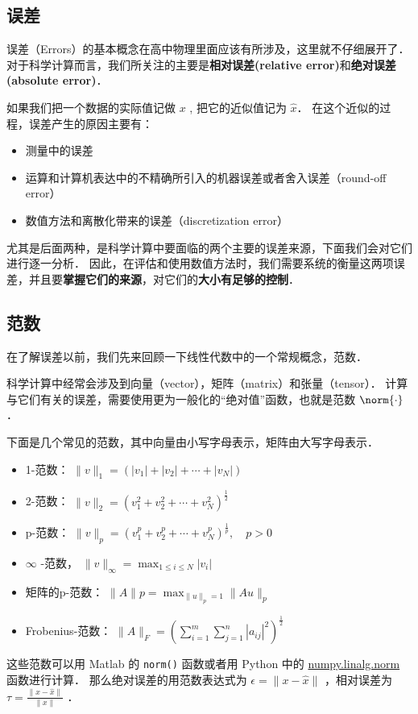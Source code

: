 
\subsection{误差}
误差（Errors）的基本概念在高中物理里面应该有所涉及，这里就不仔细展开了． 对于科学计算而言，我们所关注的主要是\textbf{相对误差(relative error)}和\textbf{绝对误差(absolute error)}．

如果我们把一个数据的实际值记做 $x$ , 把它的近似值记为 $\hat x$． 在这个近似的过程，误差产生的原因主要有：
\begin{itemize}
\item 测量中的误差
\item 运算和计算机表达中的不精确所引入的机器误差或者舍入误差（round-off error）
\item 数值方法和离散化带来的误差（discretization error）
\end{itemize}
尤其是后面两种，是科学计算中要面临的两个主要的误差来源，下面我们会对它们进行逐一分析． 因此，在评估和使用数值方法时，我们需要系统的衡量这两项误差，并且要\textbf{掌握它们的来源}，对它们的\textbf{大小有足够的控制}．

\subsection{范数}
在了解误差以前，我们先来回顾一下线性代数中的一个常规概念，范数．

科学计算中经常会涉及到向量（vector），矩阵（matrix）和张量（tensor）． 计算与它们有关的误差，需要使用更为一般化的“绝对值”函数，也就是范数 $\norm{\cdot}$．

下面是几个常见的范数，其中向量由小写字母表示，矩阵由大写字母表示．
\begin{itemize}
\item 1-范数：  $\|v\|_1=(|v_1|+|v_2|+\cdots+|v_N|)$
\item 2-范数：  $\|v\|_2=(v_1^2+v_2^2+\cdots+v_N^2)^{\frac{1}{2}}$
\item p-范数：  $\|v\|_p=(v_1^p+v_2^p+\cdots+v_N^p)^{\frac{1}{p}},\quad p>0$
\item $\infty$  -范数，  $\|v\|_{\infty}=\max_{1\le i \le N}|v_i|$
\item 矩阵的p-范数：  $\|A\|p=\max_{\|u\|_p=1}\|Au\|_p$
\item Frobenius-范数：  $\|A\|_F=(\sum_{i=1}^m\sum_{j=1}^n|a_{ij}|^2)^{\frac{1}{2}}$
\end{itemize}

这些范数可以用 Matlab 的 \verb|norm()| 函数或者用 Python 中的 \href{https%3A//docs.scipy.org/doc/numpy/reference/generated/numpy.linalg.norm.html}{numpy.linalg.norm} 函数进行计算． 那么绝对误差的用范数表达式为  $\epsilon=\|x-\hat{x}\|$  ，相对误差为  $\tau=\frac{\|x-\hat{x}\|}{\|x\|}$  ．

